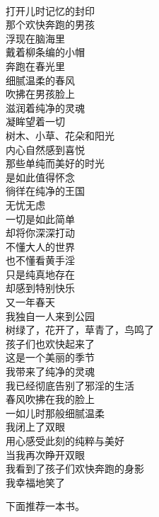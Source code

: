 \begin{poem}[春风吹醒纯净的灵魂]
    \begin{multicols}{3}
        \begin{center}~\\
            打开儿时记忆的封印 \\ 那个欢快奔跑的男孩 \\ 浮现在脑海里 \\ 戴着柳条编的小帽 \\ 奔跑在春光里 \\ 细腻温柔的春风 \\ 吹拂在男孩脸上 \\ 滋润着纯净的灵魂 \\ 凝眸望着一切 \\ 树木、小草、花朵和阳光 \\ 内心自然感到喜悦 \\ 那些单纯而美好的时光 \\ 是如此值得怀念 \\ 徜徉在纯净的王国 \\ 无忧无虑 \\ 一切是如此简单 \\ 却将你深深打动 \\ 不懂大人的世界 \\ 也不懂看黄手淫 \\ 只是纯真地存在 \\ 却感到特别快乐 \\ 又一年春天 \\ 我独自一人来到公园 \\ 树绿了，花开了，草青了，鸟鸣了 \\ 孩子们也欢快起来了 \\ 这是一个美丽的季节 \\ 我带来了纯净的灵魂 \\ 我已经彻底告别了邪淫的生活 \\ 春风吹拂在我的脸上 \\ 一如儿时那般细腻温柔 \\ 我闭上了双眼 \\ 用心感受此刻的纯粹与美好 \\ 当我再次睁开双眼 \\ 我看到了孩子们欢快奔跑的身影 \\ 我幸福地笑了
        \end{center}
    \end{multicols}
\end{poem}

下面推荐一本书。

